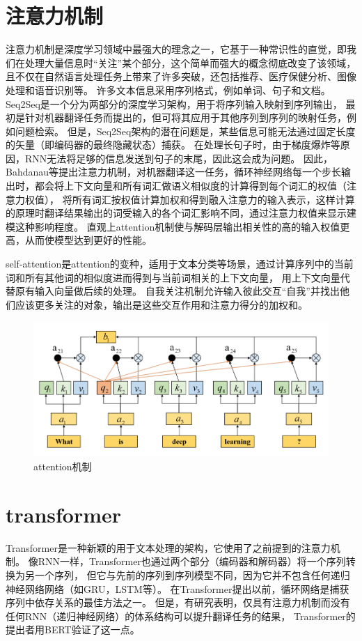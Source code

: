 \section{注意力机制}
注意力机制是深度学习领域中最强大的理念之一，它基于一种常识性的直觉，即我们在处理大量信息时“关注”某个部分，这个简单而强大的概念彻底改变了该领域，
且不仅在自然语言处理任务上带来了许多突破，还包括推荐、医疗保健分析、图像处理和语音识别等。
许多文本信息采用序列格式，例如单词、句子和文档。Seq2Seq是一个分为两部分的深度学习架构，用于将序列输入映射到序列输出，
最初是针对机器翻译任务而提出的，但可将其应用于其他序列到序列的映射任务，例如问题检索。
但是，Seq2Seq架构的潜在问题是，某些信息可能无法通过固定长度的矢量（即编码器的最终隐藏状态）捕获。
在处理长句子时，由于梯度爆炸等原因，RNN无法将足够的信息发送到句子的末尾，因此这会成为问题。
因此，Bahdanau等\cite{bahdanau2014neural}提出注意力机制，对机器翻译这一任务，循环神经网络每一个步长输出时，都会将上下文向量和所有词汇做语义相似度的计算得到每个词汇的权值（注意力权值），
将所有词汇按权值计算加权和得到融入注意力的输入表示，这样计算的原理时翻译结果输出的词受输入的各个词汇影响不同，通过注意力权值来显示建模这种影响程度。
直观上attention机制使与解码层输出相关性的高的输入权值更高，从而使模型达到更好的性能。

self-attention是attention的变种，适用于文本分类等场景，通过计算序列中的当前词和所有其他词的相似度进而得到与当前词相关的上下文向量，
用上下文向量代替原有输入向量做后续的处理。
自我关注机制允许输入彼此交互“自我”并找出他们应该更多关注的对象，输出是这些交互作用和注意力得分的加权和。
\begin{figure}[htbp]
  \centering
  \includegraphics[width=13cm]{./images/attention.png}
  \caption{attention机制}
  \label{fig:attent}
\end{figure}

\section{transformer}
Transformer\cite{vaswani2017attention}是一种新颖的用于文本处理的架构，它使用了之前提到的注意力机制。
像RNN一样，Transformer也通过两个部分（编码器和解码器）将一个序列转换为另一个序列，
但它与先前的序列到序列模型不同，因为它并不包含任何递归神经网络网络（如GRU，LSTM等）。
在Transformer提出以前，循环网络是捕获序列中依存关系的最佳方法之一。 
但是，有研究表明，仅具有注意力机制而没有任何RNN（递归神经网络）的体系结构可以提升翻译任务的结果，
Transformer的提出者用BERT验证了这一点。

